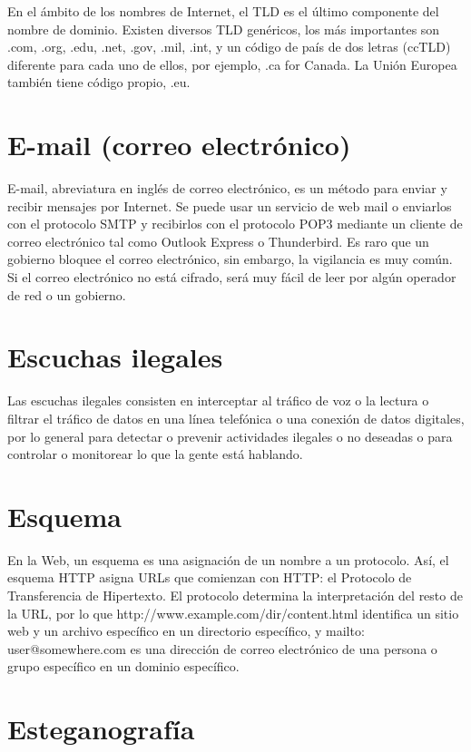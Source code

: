 \documentclass[10pt,a5paper,twoside,,]{book}
\begin{document}
En el ámbito de los nombres de Internet, el TLD es el último componente
del nombre de dominio. Existen diversos TLD genéricos, los más
importantes son .com, .org, .edu, .net, .gov, .mil, .int, y un código de
país de dos letras (ccTLD) diferente para cada uno de ellos, por
ejemplo, .ca for Canada. La Unión Europea también tiene código propio,
.eu.

\section{E-mail (correo
electrónico)}\label{e-mail-correo-electruxf3nico}

E-mail, abreviatura en inglés de correo electrónico, es un método para
enviar y recibir mensajes por Internet. Se puede usar un servicio de web
mail o enviarlos con el protocolo SMTP y recibirlos con el protocolo
POP3 mediante un cliente de correo electrónico tal como Outlook Express
o Thunderbird. Es raro que un gobierno bloquee el correo electrónico,
sin embargo, la vigilancia es muy común. Si el correo electrónico no
está cifrado, será muy fácil de leer por algún operador de red o un
gobierno.

\section{Escuchas ilegales}\label{escuchas-ilegales}

Las escuchas ilegales consisten en interceptar al tráfico de voz o la
lectura o filtrar el tráfico de datos en una línea telefónica o una
conexión de datos digitales, por lo general para detectar o prevenir
actividades ilegales o no deseadas o para controlar o monitorear lo que
la gente está hablando.

\section{Esquema}\label{esquema}

En la Web, un esquema es una asignación de un nombre a un protocolo.
Así, el esquema HTTP asigna URLs que comienzan con HTTP: el Protocolo de
Transferencia de Hipertexto. El protocolo determina la interpretación
del resto de la URL, por lo que http://www.example.com/dir/content.html
identifica un sitio web y un archivo específico en un directorio
específico, y mailto: user@somewhere.com es una dirección de correo
electrónico de una persona o grupo específico en un dominio específico.

\section{Esteganografía}\label{esteganografuxeda}
\end{document}
